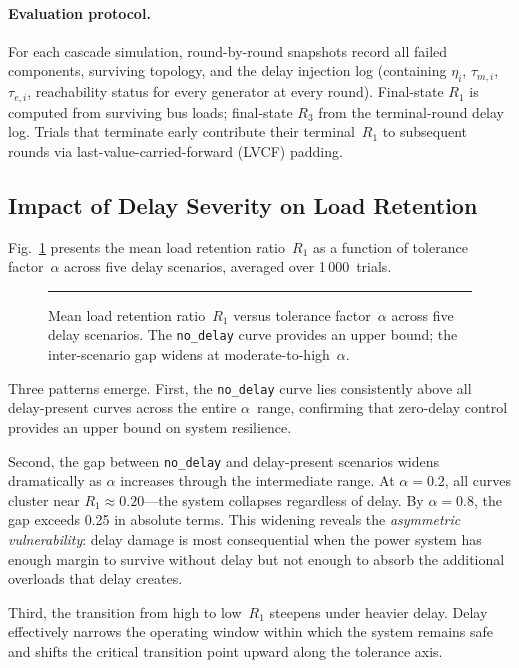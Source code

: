 \documentclass[a4paper,fleqn]{cas-dc}
\newcommand{\Rone}{R_1}
\newcommand{\Rthree}{R_3}
\newcommand{\nodelay}{\texttt{no\_delay}}
\begin{document}
\paragraph{Evaluation protocol.}
For each cascade simulation, round-by-round snapshots record all failed
components, surviving topology, and the delay injection log (containing
$\eta_i$, $\tau_{m,i}$, $\tau_{e,i}$, reachability status for every
generator at every round).  Final-state $\Rone$ is computed from
surviving bus loads; final-state $\Rthree$ from the terminal-round delay
log.  Trials that terminate early contribute their terminal~$\Rone$ to
subsequent rounds via last-value-carried-forward (LVCF) padding.

\subsection{Impact of Delay Severity on Load Retention}\label{sec:R1result}

Fig.~\ref{fig:R1} presents the mean load retention ratio~$\Rone$ as a
function of tolerance factor~$\alpha$ across five delay scenarios,
averaged over 1\,000~trials.

\begin{figure}[t]
\centering
\rule{\columnwidth}{4cm}  %
\caption{Mean load retention ratio~$\Rone$ versus tolerance
  factor~$\alpha$ across five delay scenarios.  The \nodelay{} curve
  provides an upper bound; the inter-scenario gap widens at
  moderate-to-high~$\alpha$.}\label{fig:R1}
\end{figure}

Three patterns emerge.  First, the \nodelay{} curve lies consistently
above all delay-present curves across the entire $\alpha$~range,
confirming that zero-delay control provides an upper bound on system
resilience.

Second, the gap between \nodelay{} and delay-present scenarios widens
dramatically as $\alpha$ increases through the intermediate range.  At
$\alpha=0.2$, all curves cluster near $\Rone\approx0.20$---the system
collapses regardless of delay.  By $\alpha=0.8$, the gap exceeds 0.25
in absolute terms.  This widening reveals the \emph{asymmetric
vulnerability}: delay damage is most consequential when the power system
has enough margin to survive without delay but not enough to absorb the
additional overloads that delay creates.

Third, the transition from high to low~$\Rone$ steepens under heavier
delay.  Delay effectively narrows the operating window within which the
system remains safe and shifts the critical transition point upward
along the tolerance axis.
\end{document}
